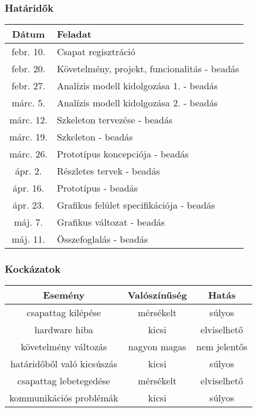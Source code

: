 \subsubsection{Határidők}
\begin{tabular}{|c|l|}
\hline 
\textbf{Dátum} & \textbf{Feladat} \\ 
\hline 
febr. 10. & Csapat regisztráció \\ 
\hline 
febr. 20. & Követelmény, projekt, funcionalitás -  beadás \\ 
\hline 
febr. 27. & Analízis modell kidolgozása 1. -  beadás \\ 
\hline 
márc. 5. & Analízis modell kidolgozása 2. -  beadás \\ 
\hline 
márc. 12. & Szkeleton tervezése - beadás \\ 
\hline 
márc. 19. & Szkeleton - beadás \\ 
\hline 
márc. 26. & Prototípus koncepciója - beadás \\ 
\hline 
ápr. 2. & Részletes tervek - beadás \\ 
\hline 
ápr. 16. & Prototípus - beadás \\ 
\hline 
ápr. 23. & Grafikus felület specifikációja - beadás \\ 
\hline 
máj. 7. & Grafikus változat - beadás \\ 
\hline 
máj. 11. & Összefoglalás - beadás \\ 
\hline 
\end{tabular} 

\subsubsection{Kockázatok}

\begin{tabular}{|c|c|c|}
\hline 
\textbf{Esemény} & \textbf{Valószínűség} & \textbf{Hatás} \\ 
\hline 
csapattag kilépése & mérsékelt & súlyos \\ 
\hline 
hardware hiba & kicsi & elviselhető \\ 
\hline 
követelmény változás & nagyon magas & nem jelentős \\ 
\hline 
határidőből való kicsúszás & kicsi & súlyos \\ 
\hline 
csapattag lebetegedése & mérsékelt & elviselhető \\ 
\hline 
kommunikációs  problémák & kicsi & súlyos \\ 
\hline 
\end{tabular} 
